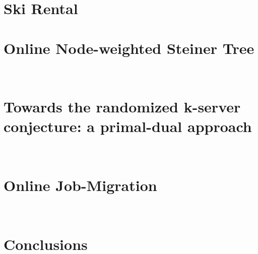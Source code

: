 \documentclass[10pt, twocolumn]{article}
\begin{document}
\section{Ski Rental}

\section{Online Node-weighted Steiner Tree}
~\cite{naor11:node-weighted-steiner-tree}

\section{Towards the randomized k-server conjecture: a primal-dual approach}
~\cite{bansal10:k-server}

\section{Online Job-Migration}
~\cite{buchbinder11:job-migration} ~\cite{buchbinder11:job-migration-techreport}

\section{Conclusions}



\end{document}
